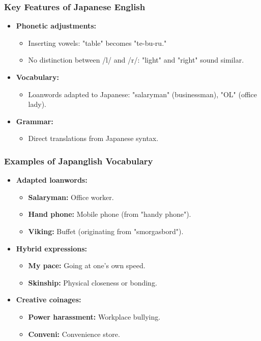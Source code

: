 \documentclass{beamer}
\begin{document}
\begin{frame}
\frametitle{Key Features of Japanese English}
\begin{itemize}
    \item \textbf{Phonetic adjustments:}
    \begin{itemize}
        \item Inserting vowels: "table" becomes "te-bu-ru."
        \item No distinction between /l/ and /r/: "light" and "right" sound similar.
    \end{itemize}
    \item \textbf{Vocabulary:}
    \begin{itemize}
        \item Loanwords adapted to Japanese: "salaryman" (businessman), "OL" (office lady).
    \end{itemize}
    \item \textbf{Grammar:}
    \begin{itemize}
        \item Direct translations from Japanese syntax.
    \end{itemize}
\end{itemize}
\end{frame}

\begin{frame}
\frametitle{Examples of Japanglish Vocabulary}
\begin{itemize}
    \item \textbf{Adapted loanwords:}
    \begin{itemize}
        \item \textbf{Salaryman:} Office worker.
        \item \textbf{Hand phone:} Mobile phone (from "handy phone").
        \item \textbf{Viking:} Buffet (originating from "smorgasbord").
    \end{itemize}
    \item \textbf{Hybrid expressions:}
    \begin{itemize}
        \item \textbf{My pace:} Going at one's own speed.
        \item \textbf{Skinship:} Physical closeness or bonding.
    \end{itemize}
    \item \textbf{Creative coinages:}
    \begin{itemize}
        \item \textbf{Power harassment:} Workplace bullying.
        \item \textbf{Conveni:} Convenience store.
    \end{itemize}
\end{itemize}
\end{frame}
\end{document}
